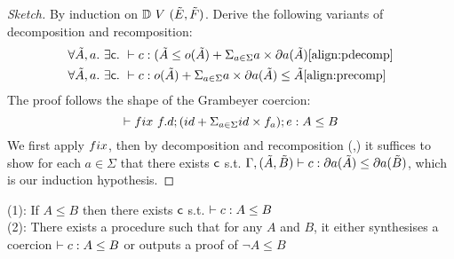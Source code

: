 \documentclass[a4paper,UKenglish,cleveref, autoref, thm-restate]{lipics-v2021}
\newcommand\mycomment[1]{}
\begin{document}
\begin{proof}[Sketch]
By induction on $\mathbb{D}~{V}~(\tilde{E},\tilde{F})$. Derive the following variants of decomposition and recomposition:
\begin{align}
&\forall \tilde{A},a.~\exists \dslcom{c}.~\contains{}{c}{(\tilde{A}}{\myo{\tilde{A}} + \Sigma_{a \in \Sigma} a \times \mypar{a}{\tilde{A}}} \ref{align:pdecomp}\\
&\forall \tilde{A},a.~\exists \dslcom{c}.~\contains{}{c}
{\myo{\tilde{A}} + \Sigma_{a \in \Sigma} a \times \mypar{a}{\tilde{A}}}
{\tilde{A}} \ref{align:precomp}
\end{align}
The proof follows the shape of the Grambeyer coercion:
\[\contains{}{\fix ~f.d;(id + \Sigma_{a \in \Sigma} id\times f_a); e}{A}{B}\]
We first apply $\fix$, then by decomposition and recomposition (\label{align:pdecomp},\label{align:precomp}) it suffices to show for each $a \in \Sigma$ that there exists $\textsf{c}$ s.t. $\contains{\Gamma,\pder{A}{B}}{c}{\mypar{a}{\tilde{A}}}{\mypar{a}{\tilde{B}}}$, which is our induction hypothesis.
\end{proof}
\begin{corollary}
(1): If $A \leq B$ then there exists $\textsf{c}$ s.t. $\contains{}{c}{A}{B}$\\
(2): There exists a procedure such that for any $A$ and $B$, it either synthesises a coercion $\contains{}{c}{A}{B}$ or outputs a proof of $\lnot A \leq B $ \mycomment{Point to this in code}
\end{corollary}





\end{document}
